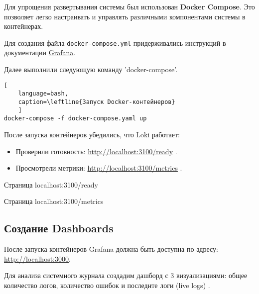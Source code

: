 Для упрощения развертывания системы был использован \textbf{Docker Compose}.
Это позволяет легко настраивать
и управлять различными компонентами системы в контейнерах.

Для создания файла \texttt{docker-compose.yml}
придерживались инструкций в документации
\href{https://grafana.com/docs/loki/latest/setup/install/docker/}{Grafana}.





Далее выполнили следующую команду 'docker-compose'.

\begin{lstlisting}[
	language=bash,
	caption=\leftline{Запуск Docker-контейнеров}
	]
docker-compose -f docker-compose.yaml up
\end{lstlisting}

После запуска контейнеров убедились, что Loki работает:
\begin{itemize}
	\item Проверили готовность:
		\url{http://localhost:3100/ready} .
	\item Просмотрели метрики:
		\url{http://localhost:3100/metrics} .
\end{itemize}

\begin{image}
    \caption{Страница localhost:3100/ready}
    \label{fig:loki:ready}
\end{image}

\begin{image}
    \caption{Страница localhost:3100/metrics}
    \label{fig:loki:metrics}
\end{image}

\subsection{Создание Dashboards}

После запуска контейнеров Grafana должна быть доступна
по адресу: \url{http://localhost:3000}.

Для анализа системного журнала создадим дашборд
с 3 визуализациями: общее количество логов, количество ошибок
и последнте логи (live logs) .

